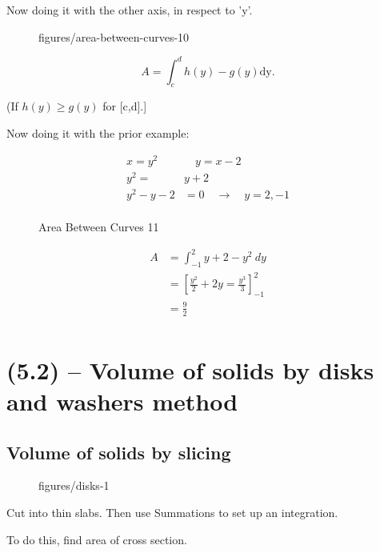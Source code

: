 Now doing it with the other axis, in respect to 'y'.

\begin{figure}[ht]
    \centering
    \caption{figures/area-between-curves-10}
    \label{fig:area-between-curves-10}
\end{figure}

\[
A= \int_{c}^{d} h(y)-g(y) \text{dy} 
.\] 

(If $h(y) \geq g(y)$ for [c,d].]

Now doing it with the prior example:

\begin{align*}
    x=y^2 \quad & \quad y=x-2\\
    y^2=& y+2\\
    y^2-y-2 &= 0 \quad \to \quad y=2,-1 \\ 
\end{align*}

\begin{figure}[ht]
    \centering
    \caption{Area Between Curves 11}
    \label{fig:area-between-curves-11}
\end{figure}

\begin{align*}
    A &= \int_{-1}^{2} y+2-y^2 \ dy \\
      &= \left[ \frac{y^2}{2}+2y = \frac{y^3}{3}\right]_{-1}^2\\
      &= \frac{9}{2} \\
\end{align*}



\chapter{(5.2) -- Volume of solids by disks and washers method}

\section{Volume of solids by slicing}

\begin{figure}[ht]
    \centering
    \caption{figures/disks-1}
    \label{fig:disks}
\end{figure}

Cut into thin slabs. Then use Summations to set up an integration.

To do this, find area of cross section.


